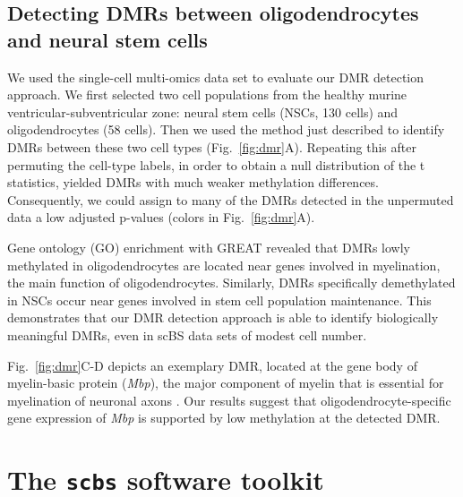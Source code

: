 \documentclass[twocolumn,10pt]{article}
\begin{document}
\subsection{Detecting DMRs between oligodendrocytes and neural stem cells}


We used the single-cell multi-omics data set \citep{kremer_scnmt} to evaluate our DMR detection approach.
We first selected two cell populations from the healthy murine ventricular-subventricular zone: neural stem cells (NSCs, 130 cells) and oligodendrocytes (58 cells).
Then we used the method just described to identify DMRs between these two cell types (Fig.~\ref{fig:dmr}A).
Repeating this after permuting the cell-type labels, in order to obtain a null distribution of the t statistics, yielded DMRs with much weaker methylation differences.
Consequently, we could assign to many of the DMRs detected in the unpermuted data a low adjusted p-values (colors in Fig.~\ref{fig:dmr}A).

Gene ontology (GO) enrichment with GREAT \citep{mclean2010great} revealed that DMRs lowly methylated in oligodendrocytes are located near genes involved in myelination, the main function of oligodendrocytes.
Similarly, DMRs specifically demethylated in NSCs occur near genes involved in stem cell population maintenance.
This demonstrates that our DMR detection approach is able to identify biologically meaningful DMRs, even in scBS data sets of modest cell number.

Fig.~\ref{fig:dmr}C-D depicts an exemplary DMR, located at the gene body of myelin-basic protein (\textit{Mbp}), the major component of myelin that is essential for myelination of neuronal axons \citep{mbp}.
Our results suggest that oligodendrocyte-specific gene expression of \textit{Mbp} is supported by low methylation at the detected DMR.


\section{The \texttt{scbs} software toolkit}
\end{document}
